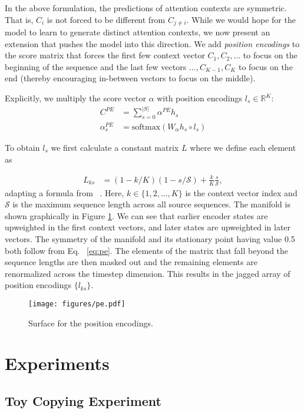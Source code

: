 \documentclass[11pt,letterpaper]{article}
\begin{document}
In the above formulation, the predictions of attention contexts are symmetric. That is, $C_i$ is not forced to be different from $C_{j\neq i}$. While we would hope for the model to learn to generate distinct attention contexts, we now present an extension that pushes the model into this direction. We add \emph{position encodings} to the score matrix that forces the first few context vector $C_1, C_2, ...$ to focus on the beginning of the sequence and the last few vectors $...,C_{K-1}, C_K$ to focus on the end (thereby encouraging in-between vectors to focus on the middle).


Explicitly, we multiply the score vector $\alpha$ with position encodings $l_s\in \mathbb{R}^{K}$:
\begin{align}
    C^{PE} & = \sum_{s=0}^{|S|}{\alpha^{PE} h_s} \\
    \alpha^{PE}_s & = \text{softmax}(W_\alpha h_s \circ l_s)
\end{align}

To obtain $l_s$ we first calculate a constant matrix $L$ where we define each element as

\begin{align}\label{eq:pe}
L_{ks} & = (1-k/K)(1-s/\mathcal{S})+\frac{k}{K}\frac{s}{\mathcal{S}},
\end{align}
adapting a formula from ~\cite{Sukhbaatar:2015}. Here, $k\in \{1,2,...,K\}$ is the context vector index and $\mathcal{S}$ is the maximum sequence length across all source sequences. The manifold is shown graphically in Figure \ref{fig:pe}. We can see that earlier encoder states are upweighted in the first context vectors, and later states are upweighted in later vectors. The symmetry of the manifold and its stationary point having value 0.5 both follow from Eq. ~\ref{eq:pe}. The elements of the matrix that fall beyond the sequence lengths are then masked out and the remaining elements are renormalized across the timestep dimension. This results in the jagged array of position encodings $\{l_{ks}\}$.
\begin{figure}
    \texttt{[image: figures/pe.pdf]}
    \caption{Surface for the position encodings.}
    \label{fig:pe}
\end{figure}
\section{Experiments}
\label{sec:experiments}

\subsection{Toy Copying Experiment}
\end{document}
